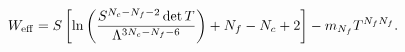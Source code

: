 \begin{equation}\label{Eq:WeffMass}
W_{\rm eff}=S 
\left[ 
\ln
\left(
\frac{
S^{N_c-N_f-2}\det T
}
{
	\Lambda^{3N_c-N_f-6}
}
\right)
+N_f-N_c+2
\right]
-m_{N_f}T^{N_fN_f}.
\end{equation}

